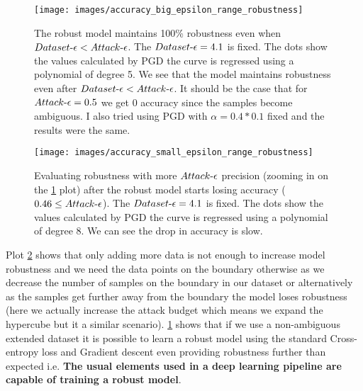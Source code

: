 \documentclass[../thesis.tex]{subfiles}
\begin{document}
	\begin{figure}
		\centering
		\texttt{[image: images/accuracy\_big\_epsilon\_range\_robustness]}
		\caption{The robust model maintains 100\% robustness even when $Dataset\text{-}\epsilon<Attack\text{-}\epsilon$. The $Dataset\text{-}\epsilon=4.1$ is fixed. The dots show the values calculated by PGD the curve is regressed using a polynomial of degree 5. We see that the model maintains robustness even after $Dataset\text{-}\epsilon < Attack\text{-}\epsilon$. It should be the case that for $Attack\text{-}\epsilon = 0.5$ we get 0 accuracy since the samples become ambiguous. I also tried using PGD with $\alpha = 0.4*0.1$ fixed and the results were the same.}
		\label{fig:accuracybigepsilonrangerobustness}
	\end{figure}
	\begin{figure}
		\centering
		\texttt{[image: images/accuracy\_small\_epsilon\_range\_robustness]}
		\caption{Evaluating robustness with more $Attack\text{-}\epsilon$ precision (zooming in on the \ref{fig:accuracybigepsilonrangerobustness} plot) after the robust model starts losing accuracy ($0.46\leq Attack\text{-}\epsilon$). The $Dataset\text{-}\epsilon=4.1$ is fixed. The dots show the values calculated by PGD the curve is regressed using a polynomial of degree 8. We can see the drop in accuracy is slow.}
		\label{fig:accuracysmallepsilonrangerobustness}
	\end{figure}

	\todo[inline]{repeat the plots \ref{fig:accuracybigepsilonrangerobustness} and \ref{fig:accuracysmallepsilonrangerobustness} for a dataset with $\epsilon \in [0.3, 0.4)$ like .35 or .37}
	
	
	Plot \ref{fig:accuracysmallepsilonrangerobustness} shows that only adding more data is not enough to increase model robustness and we need the data points on the boundary otherwise as we decrease the number of samples on the boundary in our dataset or alternatively as the samples get further away from the boundary the model loses robustness (here we actually increase the attack budget which means we expand the hypercube but it a similar scenario).  \ref{fig:accuracybigepsilonrangerobustness} shows that if we use a non-ambiguous extended dataset it is possible to learn a robust model using the standard Cross-entropy loss and Gradient descent even providing robustness further than expected i.e. \textbf{The usual elements used in a deep learning pipeline are capable of training a robust model}.
	
\end{document}
